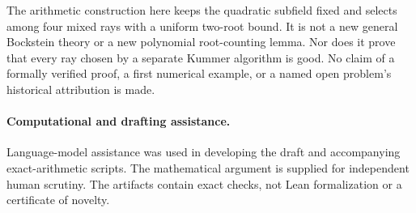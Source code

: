 \documentclass[11pt]{article}
\theoremstyle{remark}\newtheorem{remark}[theorem]{Remark}
\begin{document}
The arithmetic construction here keeps the quadratic subfield fixed and
selects among four mixed rays with a uniform two-root bound. It is not a new
general Bockstein theory or a new polynomial root-counting lemma. Nor does it
prove that every ray chosen by a separate Kummer algorithm is good. No claim
of a formally verified proof, a first numerical example, or a named open
problem's historical attribution is made.

\paragraph{Computational and drafting assistance.}
Language-model assistance was used in developing the draft and accompanying
exact-arithmetic scripts. The mathematical argument is supplied for independent
human scrutiny. The artifacts contain exact checks, not Lean formalization or
a certificate of novelty.
\end{document}
